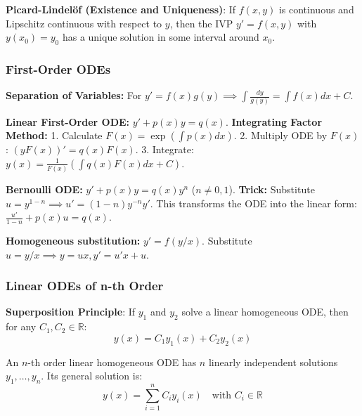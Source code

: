 \begin{theorem}
    \textbf{Picard-Lindelöf (Existence and Uniqueness)}: If $f(x, y)$ is continuous and Lipschitz continuous with respect to $y$, then the IVP $y' = f(x, y)$ with $y(x_0) = y_0$ has a unique solution in some interval around $x_0$.
\end{theorem}

\subsubsection{First-Order ODEs}

\begin{theorem}
    \textbf{Separation of Variables:} For $y' = f(x)g(y) \implies \int \frac{dy}{g(y)} = \int f(x)dx + C$.
\end{theorem}

\begin{theorem}
    \textbf{Linear First-Order ODE:} $y' + p(x)y = q(x)$.
    \textbf{Integrating Factor Method:} 
    1. Calculate $F(x) = \exp\left(\int p(x)dx\right)$.
    2. Multiply ODE by $F(x)$: $(y F(x))' = q(x)F(x)$.
    3. Integrate: $y(x) = \frac{1}{F(x)} \left(\int q(x)F(x)dx + C\right)$.
\end{theorem}

\begin{theorem}
    \textbf{Bernoulli ODE:} $y' + p(x)y = q(x)y^n$ ($n \neq 0, 1$).
    \textbf{Trick:} Substitute $u = y^{1-n} \implies u' = (1-n)y^{-n}y'$.
    This transforms the ODE into the linear form: $\frac{u'}{1-n} + p(x)u = q(x)$.
\end{theorem}

\begin{theorem}
    \textbf{Homogeneous substitution:} $y' = f(y/x)$. Substitute $u = y/x \implies y = ux, y' = u'x + u$.
\end{theorem}

\subsubsection{Linear ODEs of n-th Order}

\begin{theorem}
    \textbf{Superposition Principle}: If $y_1$ and $y_2$ solve a linear homogeneous ODE, then for any $C_1, C_2 \in \mathbb{R}$:
    $$y(x) = C_1 y_1(x) + C_2 y_2(x)$$
\end{theorem}

\begin{theorem}
    An $n$-th order linear homogeneous ODE has $n$ linearly independent solutions $y_1, \dots, y_n$. Its general solution is:
    $$y(x) = \sum_{i=1}^n C_i y_i(x) \quad \text{with } C_i \in \mathbb{R}$$
\end{theorem}


